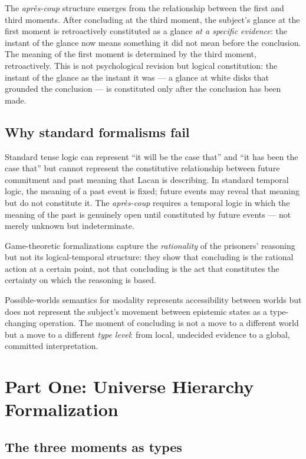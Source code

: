 \documentclass[12pt]{article}
\theoremstyle{definition}
\theoremstyle{remark}
\newcommand{\aprescoup}{\textit{apr\`es-coup}}
\begin{document}
The \aprescoup{} structure emerges from the relationship between the first and third moments. After concluding at the third moment, the subject's glance at the first moment is retroactively constituted as a glance \emph{at a specific evidence}: the instant of the glance now means something it did not mean before the conclusion. The meaning of the first moment is determined by the third moment, retroactively. This is not psychological revision but logical constitution: the instant of the glance as the instant it was --- a glance at white disks that grounded the conclusion --- is constituted only after the conclusion has been made.

\subsection{Why standard formalisms fail}

Standard tense logic can represent ``it will be the case that'' and ``it has been the case that'' but cannot represent the constitutive relationship between future commitment and past meaning that Lacan is describing. In standard temporal logic, the meaning of a past event is fixed; future events may reveal that meaning but do not constitute it. The \aprescoup{} requires a temporal logic in which the meaning of the past is genuinely open until constituted by future events --- not merely unknown but indeterminate.

Game-theoretic formalizations capture the \emph{rationality} of the prisoners' reasoning but not its logical-temporal structure: they show that concluding is the rational action at a certain point, not that concluding is the act that constitutes the certainty on which the reasoning is based.

Possible-worlds semantics for modality represents accessibility between worlds but does not represent the subject's movement between epistemic states as a type-changing operation. The moment of concluding is not a move to a different world but a move to a different \emph{type level}: from local, undecided evidence to a global, committed interpretation.

\section{Part One: Universe Hierarchy Formalization}

\subsection{The three moments as types}
\end{document}
